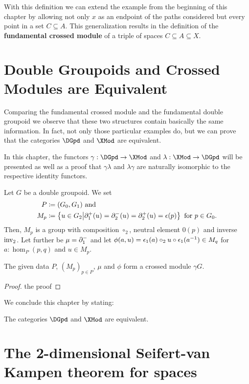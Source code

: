 With this definition we can extend the example from the beginning of this
chapter by allowing not only $x$ as an endpoint of the paths considered but every
point in a set $C \subseteq A$.
This generalization results in the definition of the \textbf{fundamental crossed
module} of a triple of spaces $C \subseteq A \subseteq X$.

\section{Double Groupoids and Crossed Modules are Equivalent}

Comparing the fundamental crossed module and the fundamental double groupoid we
observe that these two structures contain basically the same information.
In fact, not only those particular examples do, but we can prove that the categories
$\DGpd$ and $\XMod$ are equivalent.

In this chapter, the functors $\gamma : \DGpd \to \XMod$ and
$\lambda : \XMod \to \DGpd$ will be presented as well as a proof that $\gamma \lambda$
and $\lambda \gamma$ are naturally isomorphic to the respective identity functors.

\begin{lemma}
Let $G$ be a double groupoid. We set
\begin{align*}
P &\coloneqq (G_0,G_1) \text{ and } \\
M_p &\coloneqq \left\{ u \in G_2 \middle| \partial^+_1(u) = \partial^-_2(u) = \partial^+_2(u) = \epsilon(p) \right\}
	\text{ for $p \in G_0$.}
\end{align*}
Then, $M_p$ is a group with composition $\circ_2$, neutral element $0(p)$ and
inverse $\operatorname{inv_2}$.
Let further be $\mu = \partial^-_1$ and let $\phi(a,u) =
\epsilon_1(a) \circ_2 u \circ \epsilon_1(a^{-1}) \in M_q$ for $a : \hom_P(p,q)$
and $u \in M_p$.

The given data $P$, $(M_p)_{p \in P}$, $\mu$ and $\phi$ form a crossed module $\gamma G$.
\end{lemma}

\begin{proof}
the proof
\end{proof}


We conclude this chapter by stating:
\begin{thm}
The categories $\DGpd$ and $\XMod$ are equivalent.
\end{thm}

\section{The 2-dimensional Seifert-van Kampen theorem for spaces}











